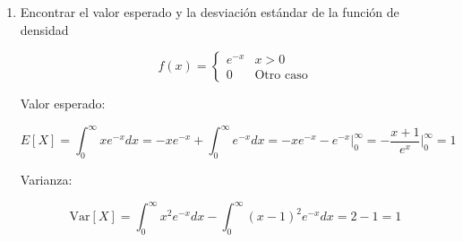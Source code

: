 \documentclass[a4paper, 12pt]{article}
\newcommand{\Aspace}{0.2cm}
\begin{document}
    \begin{enumerate}
        \item Encontrar el valor esperado y la desviación estándar de la función de densidad \par
        \[
            f(x) =
            \begin{cases}
                e^{-x} & x > 0 \\
                0 & \text{Otro caso}
            \end{cases}
        \]
            \vspace{\Aspace}
            { \color{azul} 
                \begin{flushleft}
                    Valor esperado:
                \end{flushleft}
                \[
                    E[X] 
                    = \int_{0}^{\infty} xe^{-x}dx
                    = -xe^{-x} + \int_{0}^{\infty} e^{-x}dx
                    = -xe^{-x}-e^{-x} \Big|_{0}^{\infty}
                    = -\frac{x + 1}{e^{x}} \Big|_{0}^{\infty}
                    = 1
                \]

                \begin{flushleft}
                    Varianza:
                \end{flushleft}
                \[
                    \text{Var}[X]
                    = \int_{0}^{\infty} x^{2}e^{-x}dx - \int_{0}^{\infty}(x - 1)^{2}e^{-x}dx
                    = 2 - 1
                    = 1
                \]
            }


\end{enumerate}
\end{document}

